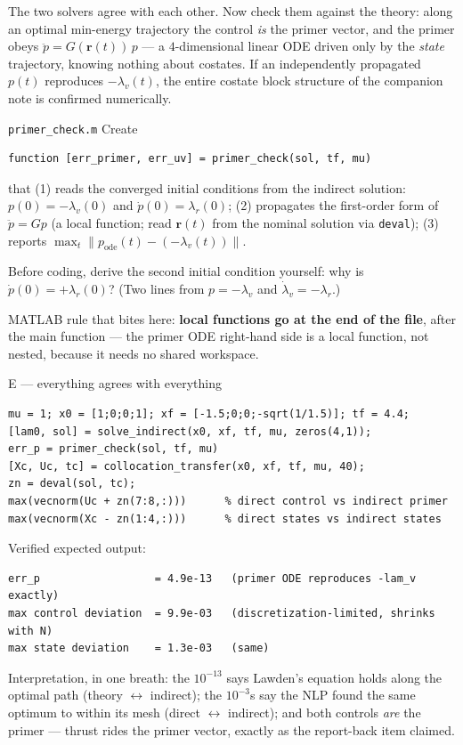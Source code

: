 \documentclass[11pt,letterpaper]{article}
\newcommand{\rvec}{\mathbf{r}}
\begin{document}
The two solvers agree with each other. Now check them against the theory:
along an optimal min-energy trajectory the control \emph{is} the primer
vector, and the primer obeys $\ddot p = G(\rvec(t))\,p$ --- a $4$-dimensional
linear ODE driven only by the \emph{state} trajectory, knowing nothing about
costates. If an independently propagated $p(t)$ reproduces $-\lambda_v(t)$,
the entire costate block structure of the companion note is confirmed
numerically.

\begin{exercise}{\texttt{primer\_check.m}}
Create
\begin{verbatim}
function [err_primer, err_uv] = primer_check(sol, tf, mu)
\end{verbatim}
that (1) reads the converged initial conditions from the indirect solution:
$p(0) = -\lambda_v(0)$ and $\dot p(0) = \lambda_r(0)$; (2) propagates the
first-order form of $\ddot p = G p$ (a local function; read $\rvec(t)$ from
the nominal solution via \texttt{deval}); (3) reports
$\max_t\|p_{\text{ode}}(t) - (-\lambda_v(t))\|$.

Before coding, derive the second initial condition yourself: why is
$\dot p(0) = +\lambda_r(0)$? (Two lines from $p = -\lambda_v$ and
$\dot\lambda_v = -\lambda_r$.)
\end{exercise}

\begin{hint}
MATLAB rule that bites here: \textbf{local functions go at the end of the
file}, after the main function --- the primer ODE right-hand side is a local
function, not nested, because it needs no shared workspace.
\end{hint}

\begin{checkpoint}{E --- everything agrees with everything}
\begin{verbatim}
mu = 1; x0 = [1;0;0;1]; xf = [-1.5;0;0;-sqrt(1/1.5)]; tf = 4.4;
[lam0, sol] = solve_indirect(x0, xf, tf, mu, zeros(4,1));
err_p = primer_check(sol, tf, mu)
[Xc, Uc, tc] = collocation_transfer(x0, xf, tf, mu, 40);
zn = deval(sol, tc);
max(vecnorm(Uc + zn(7:8,:)))      % direct control vs indirect primer
max(vecnorm(Xc - zn(1:4,:)))      % direct states vs indirect states
\end{verbatim}
Verified expected output:
\begin{verbatim}
err_p                  = 4.9e-13   (primer ODE reproduces -lam_v exactly)
max control deviation  = 9.9e-03   (discretization-limited, shrinks with N)
max state deviation    = 1.3e-03   (same)
\end{verbatim}
Interpretation, in one breath: the $10^{-13}$ says Lawden's equation holds
along the optimal path (theory $\leftrightarrow$ indirect); the $10^{-3}$s
say the NLP found the same optimum to within its mesh (direct
$\leftrightarrow$ indirect); and both controls \emph{are} the primer ---
thrust rides the primer vector, exactly as the report-back item claimed.
\end{checkpoint}
\end{document}
